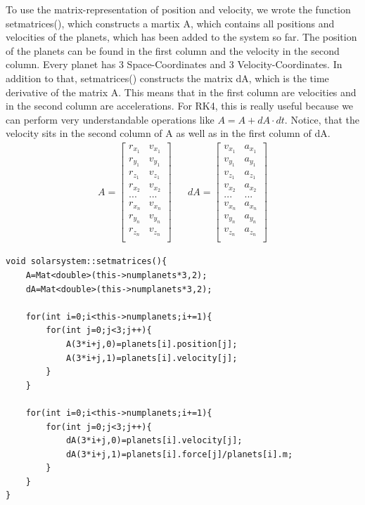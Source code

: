 \documentclass[10pt,a4paper]{article}
\begin{document}
To use the matrix-representation of position and velocity, we wrote the function setmatrices(), which constructs a martix A, which contains all positions and velocities of the planets, which has been added to the system so far. The position of the planets can be found in the first column and the velocity in the second column. Every planet has 3 Space-Coordinates and 3 Velocity-Coordinates. In addition to that, setmatrices() constructs the matrix dA, which is the time derivative of the matrix A. This means that in the first column are velocities and in the second column are accelerations. For RK4, this is really useful because we can perform very understandable operations like $A=A+dA \cdot dt $.
Notice, that the velocity sits in the second column of A as well as in the first column of dA.
\begin{align}
A=
\begin{bmatrix}
r_{x_1} & v_{x_1}\\
r_{y_1} & v_{y_1} \\
r_{z_1} & v_{z_1} \\
r_{x_2} & v_{x_2} \\
... & ... \\
r_{x_n} & v_{x_n}\\
r_{y_n} & v_{y_n} \\
r_{z_n} & v_{z_n} \\
\end{bmatrix}
& &
dA=
\begin{bmatrix}
v_{x_1} & a_{x_1}\\
v_{y_1} & a_{y_1} \\
v_{z_1} & a_{z_1} \\
v_{x_2} & a_{x_2} \\
... & ... \\
v_{x_n} & a_{x_n}\\
v_{y_n} & a_{y_n} \\
v_{z_n} & a_{z_n} \\
\end{bmatrix}
\end{align}
\begin{lstlisting}
void solarsystem::setmatrices(){
    A=Mat<double>(this->numplanets*3,2);
    dA=Mat<double>(this->numplanets*3,2);
    
    for(int i=0;i<this->numplanets;i+=1){
        for(int j=0;j<3;j++){
            A(3*i+j,0)=planets[i].position[j];
            A(3*i+j,1)=planets[i].velocity[j];
        }
    }
    
    for(int i=0;i<this->numplanets;i+=1){
        for(int j=0;j<3;j++){
            dA(3*i+j,0)=planets[i].velocity[j];
            dA(3*i+j,1)=planets[i].force[j]/planets[i].m;
        }
    }
}
\end{lstlisting}
\end{document}
